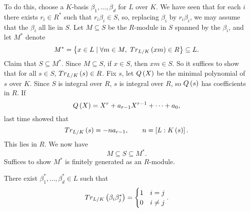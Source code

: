 To do this, choose a $ K $-basis $ \beta_1, \dots, \beta_d $ for $ L $ over $ K $. We have seen that for each $ i $ there exists $ r_i \in R^* $ such that $ r_i\beta_i \in S $, so, replacing $ \beta_i $ by $ r_i\beta_i $, we may assume that the $ \beta_i $ all lie in $ S $. Let $ M \subseteq S $ be the $ R $-module in $ S $ spanned by the $ \beta_i $, and let $ M^* $ denote
$$ M^* = \left\{ x \in L \mid \forall m \in M, \ Tr_{L / K}\left( xm \right) \in R \right\} \subseteq L. $$
Claim that $ S \subseteq M^* $. Since $ M \subseteq S $, if $ x \in S $, then $ xm \in S $. So it suffices to show that for all $ s \in S $, $ Tr_{L / K}\left( s \right) \in R $. Fix $ s $, let $ Q\left( X \right) $ be the minimal polynomial of $ s $ over $ K $. Since $ S $ is integral over $ R $, $ s $ is integral over $ R $, so $ Q\left( s \right) $ has coefficients in $ R $. If
$$ Q\left( X \right) = X^r + a_{r - 1}X^{r - 1} + \dots + a_0, $$
last time showed that
$$ Tr_{L / K}\left( s \right) = -na_{r - 1}, \qquad n = \left[ L : K\left( s \right) \right]. $$
This lies in $ R $. We now have
$$ M \subseteq S \subseteq M^*. $$
Suffices to show $ M^* $ is finitely generated as an $ R $-module.

\begin{proposition}
There exist $ \beta_1^*, \dots, \beta_d^* \in L $ such that
$$ Tr_{L / K}\left( \beta_i\beta_j^* \right) = \begin{cases} 1 & i = j \\ 0 & i \ne j \end{cases}. $$
\end{proposition}

